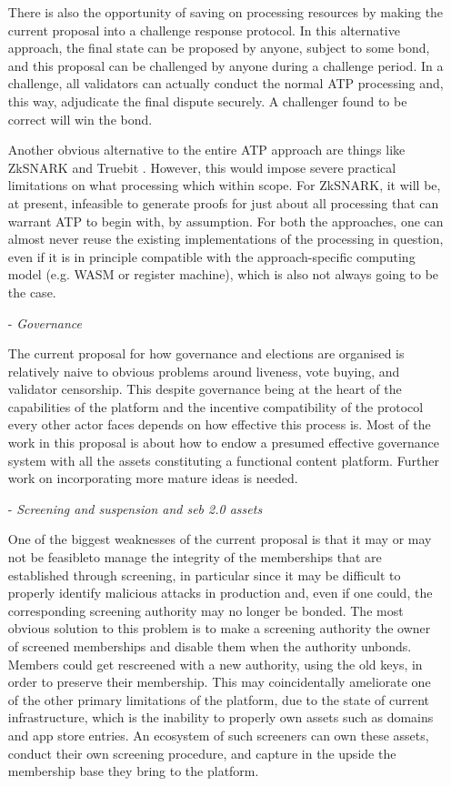 \documentclass{article}
\begin{document}
\begin{itemize}
    There is also the opportunity of saving on processing resources by making the current proposal into a challenge response protocol. In this alternative approach, the final state can be proposed by anyone, subject to some bond, and this proposal can be challenged by anyone during a challenge period. In a challenge, all validators can actually conduct the normal ATP processing and, this way, adjudicate the final dispute securely. A challenger found to be correct will win the bond.

    Another obvious alternative to the entire ATP approach are things like ZkSNARK \cite{ben2014succinct} and Truebit \cite{teutsch2017scalable}. However, this would impose severe practical limitations on what processing which within scope. For ZkSNARK, it will be, at present, infeasible to generate proofs for just about all processing that can warrant ATP to begin with, by assumption. For both the approaches, one can almost never reuse the existing implementations of the processing in question, even if it is in principle compatible with the approach-specific computing model (e.g. WASM or register machine), which is also not always going to be the case.

    \item[-] \textit{Governance}

    The current proposal for how governance and elections are organised is relatively naive to obvious problems around liveness, vote buying, and validator censorship. This despite governance being at the heart of the capabilities of the platform and the incentive compatibility of the protocol every other actor faces depends on how effective this process is. Most of the work in this proposal is about how to endow a presumed effective governance system with all the assets constituting a functional content platform. Further work on incorporating more mature ideas is needed.

    \item[-] \textit{Screening and suspension and seb 2.0 assets}

    One of the biggest weaknesses of the current proposal is that it may or may not be feasibleto manage the integrity of the memberships that are established through screening, in particular since it may be difficult to properly identify malicious attacks in production and, even if one could, the corresponding screening authority may no longer be bonded. The most obvious solution to this problem is to make a screening authority the owner of screened memberships and disable them when the authority unbonds. Members could get rescreened with a new authority, using the old keys, in order to preserve their membership. This may coincidentally ameliorate one of the other primary limitations of the platform, due to the state of current infrastructure, which is the inability to properly own assets such as domains and app store entries. An ecosystem of such screeners can own these assets, conduct their own screening procedure, and capture in the upside the membership base they bring to the platform.


\end{itemize}
\end{document}
